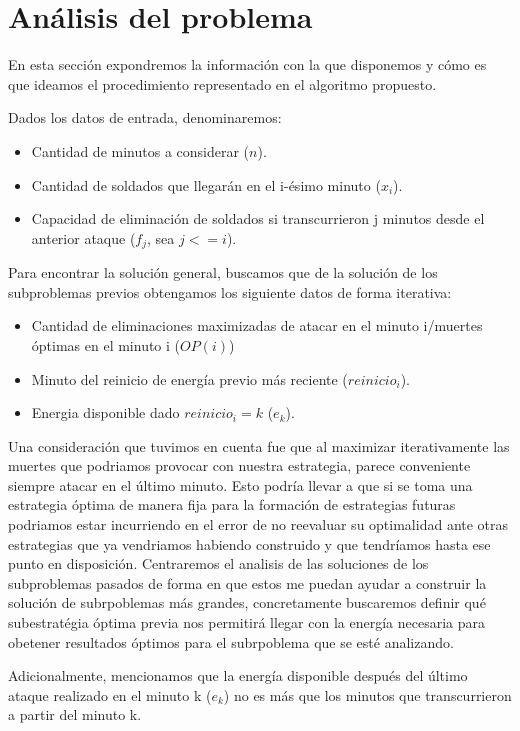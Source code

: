 \section{Análisis del problema}\label{sec:analisisProblema}
En esta sección expondremos la información con la que disponemos y cómo es que ideamos el procedimiento representado en el algoritmo propuesto.

Dados los datos de entrada, denominaremos:
\begin{itemize}
    \item Cantidad de minutos a considerar ($n$).
    \item Cantidad de soldados que llegarán en el i-ésimo minuto ($x_i$).
    \item Capacidad de eliminación de soldados si transcurrieron j minutos desde el anterior ataque ($f_j$, sea $j<=i$).
\end{itemize}

Para encontrar la solución general, buscamos que de la solución de los subproblemas previos obtengamos los siguiente datos de forma iterativa:
\begin{itemize}
    \item Cantidad de eliminaciones maximizadas de atacar en el minuto i/muertes óptimas en el minuto i ($OP(i)$)
    \item Minuto del reinicio de energía previo más reciente ($reinicio_i$).
    \item Energia disponible dado $reinicio_i=k$  ($e_k$).
\end{itemize}

\setlength{\parindent}{0cm}Una consideración que tuvimos en cuenta fue que al maximizar iterativamente las muertes que podriamos provocar con nuestra estrategia, parece conveniente siempre atacar en el último minuto. Esto podría llevar a que si se toma una estrategia óptima de manera fija para la formación de estrategias futuras podriamos estar incurriendo en el error de no reevaluar su optimalidad ante otras estrategias que ya vendriamos habiendo construido y que tendríamos hasta ese punto en disposición. Centraremos el analisis de las soluciones de los subproblemas pasados de forma en que estos me puedan ayudar a construir la solución de subrpoblemas más grandes, concretamente buscaremos definir qué subestratégia óptima previa nos permitirá llegar con la energía necesaria para obetener resultados óptimos para el subrpoblema que se esté analizando. 

\setlength{\parindent}{0cm}Adicionalmente, mencionamos que la energía disponible después del último ataque realizado en el minuto k ($e_k$) no es más que los minutos que transcurrieron a partir del minuto k.

